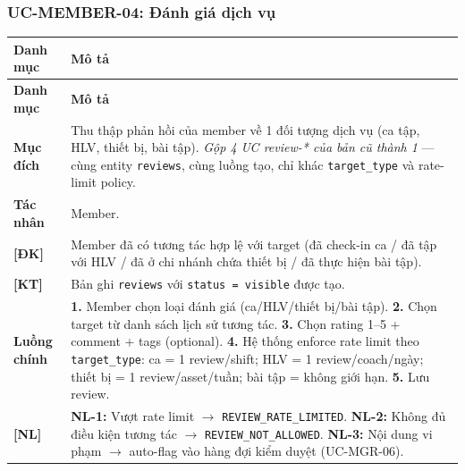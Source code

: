 \subsubsection{UC-MEMBER-04: Đánh giá dịch vụ}
\begingroup
\renewcommand{\arraystretch}{1.3}
\begin{longtable}{|>{\centering\arraybackslash}m{3cm}|>{\raggedright\arraybackslash}m{12cm}|}
\hline
\textbf{Danh mục} & \textbf{Mô tả} \\ \hline
\endfirsthead
\hline
\textbf{Danh mục} & \textbf{Mô tả} \\ \hline
\endhead
\hline
\endfoot
\textbf{Mục đích} & Thu thập phản hồi của member về 1 đối tượng dịch vụ (ca tập, HLV, thiết bị, bài tập). \emph{Gộp 4 UC review-* của bản cũ thành 1} — cùng entity \texttt{reviews}, cùng luồng tạo, chỉ khác \texttt{target\_type} và rate-limit policy. \\
\hline
\textbf{Tác nhân} & Member. \\
\hline
\textbf{[ĐK]} & Member đã có tương tác hợp lệ với target (đã check-in ca / đã tập với HLV / đã ở chi nhánh chứa thiết bị / đã thực hiện bài tập). \\
\hline
\textbf{[KT]} & Bản ghi \texttt{reviews} với \texttt{status = visible} được tạo. \\
\hline
\textbf{Luồng chính} & \textbf{1.} Member chọn loại đánh giá (ca/HLV/thiết bị/bài tập). \textbf{2.} Chọn target từ danh sách lịch sử tương tác. \textbf{3.} Chọn rating 1--5 + comment + tags (optional). \textbf{4.} Hệ thống enforce rate limit theo \texttt{target\_type}: ca = 1 review/shift; HLV = 1 review/coach/ngày; thiết bị = 1 review/asset/tuần; bài tập = không giới hạn. \textbf{5.} Lưu review. \\
\hline
\textbf{[NL]} & \textbf{NL-1:} Vượt rate limit $\rightarrow$ \texttt{REVIEW\_RATE\_LIMITED}. \textbf{NL-2:} Không đủ điều kiện tương tác $\rightarrow$ \texttt{REVIEW\_NOT\_ALLOWED}. \textbf{NL-3:} Nội dung vi phạm $\rightarrow$ auto-flag vào hàng đợi kiểm duyệt (UC-MGR-06). \\
\hline
\end{longtable}
\endgroup

